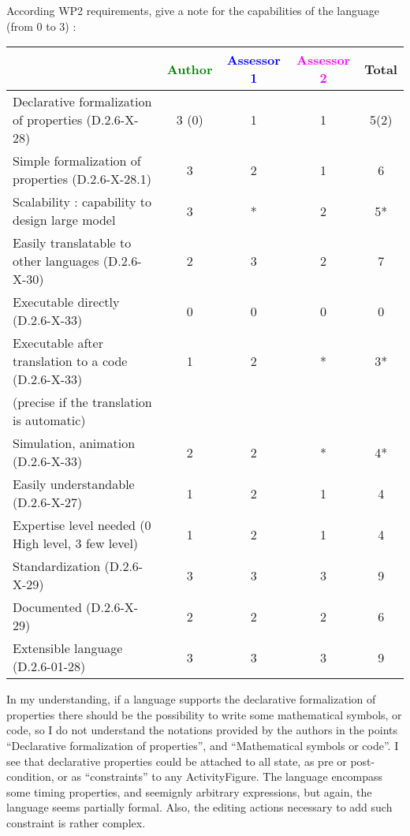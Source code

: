 According WP2 requirements, give a note for the capabilities of the language (from 0 to 3) :

\begin{tabular}{|l | c | c | c | c|}
\hline
& \textcolor{green}{Author} & \textcolor{blue}{Assessor 1} & \textcolor{magenta}{Assessor 2} & Total \\
\hline
Declarative formalization of properties (D.2.6-X-28) & 3 (0) & 1 & 1 & 5(2) \\
\hline
Simple formalization of properties (D.2.6-X-28.1) & 3 &  2 & 1 & 6 \\
\hline
Scalability : capability to design large model & 3 & * & 2 & 5* \\
\hline
Easily translatable to other languages (D.2.6-X-30) & 2 & 3 & 2 & 7 \\
\hline
Executable directly (D.2.6-X-33) & 0 & 0 & 0 & 0 \\
\hline
Executable after translation to a code (D.2.6-X-33) & 1 & 2 & * & 3* \\
(precise if the translation is automatic) & & & & \\
\hline
Simulation, animation (D.2.6-X-33) & 2 & 2 & * & 4* \\
\hline
Easily understandable (D.2.6-X-27) & 1 & 2 &  1 & 4 \\
\hline
Expertise level needed (0 High level, 3 few level) & 1 & 2 &  1 & 4 \\
\hline
Standardization (D.2.6-X-29) & 3 & 3 & 3 & 9 \\
\hline
Documented (D.2.6-X-29) & 2 & 2 & 2 & 6 \\
\hline
Extensible language (D.2.6-01-28) & 3 & 3 & 3 & 9 \\
\hline
\end{tabular}

\begin{assessor1}
In my understanding, if a language supports the declarative formalization of properties there should be the possibility to write some mathematical symbols, or code, so I do not understand the notations provided by the authors in the points
"`Declarative formalization of properties"', and "`Mathematical symbols or code"'. I see that declarative properties could be attached to all state, as pre or post-condition, or as "`constraints"' to any ActivityFigure. The language encompass some timing properties, and seemignly arbitrary expressions, but again, the language seems partially formal. Also, the editing actions necessary to add such constraint is rather complex. 
\end{assessor1}


